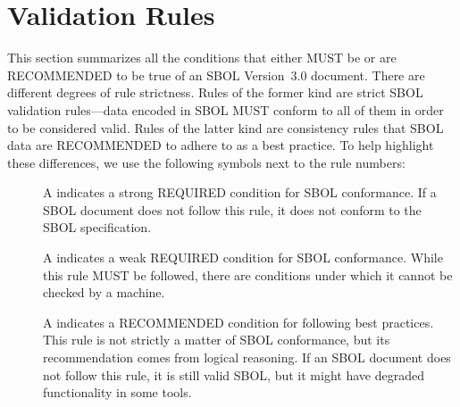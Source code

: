 \newcommand{\printValid}{\validRule{sbol3-\arabic{sbolCtr}\addtocounter{sbolCtr}{1}}}
\newcommand{\printComplete}{\completeRule{sbol3-\arabic{sbolCtr}\addtocounter{sbolCtr}{1}}}
\newcommand{\printWarning}{\consistencyRule{sbol3-\arabic{sbolCtr}\addtocounter{sbolCtr}{1}}}
\newcommand{\printModeling}{\modelingRule{sbol3-\arabic{sbolCtr}\addtocounter{sbolCtr}{1}}}

\section{Validation Rules}
\label{validation}

This section summarizes all the conditions that either MUST be or 
are RECOMMENDED to be true of an SBOL Version~3.0 document. There are different degrees of rule strictness.  
Rules of the former kind are strict SBOL validation rules---data encoded in SBOL MUST conform to
all of them in order to be considered valid. Rules of the latter kind
are consistency rules that SBOL data are RECOMMENDED to adhere to as a best practice.  To help highlight these differences, we use the
following symbols next to the rule numbers:


\begin{description}
\item[\hspace*{6.5pt}\vSymbol\vsp] A \vSymbolName indicates a strong
  REQUIRED condition for SBOL conformance. If a SBOL document does not follow this rule, it does not conform to the SBOL
  specification.  

\item[\hspace*{6.5pt}\rSymbol\rsp] A \rSymbolName indicates a weak
  REQUIRED condition for SBOL conformance. While this rule MUST be followed, there are conditions under which it cannot be checked by a machine. 

\item[\hspace*{6.5pt}\mSymbol\msp] A \mSymbolName indicates a 
  RECOMMENDED condition for following best practices.  This rule is not strictly a matter of SBOL conformance, but its recommendation comes from logical
  reasoning.  If an SBOL document does not follow this rule, it is still valid SBOL, but it might have degraded functionality in some tools.  
\end{description}

